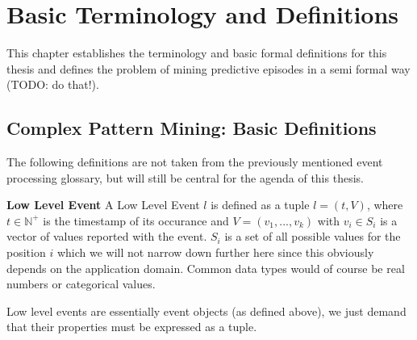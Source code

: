 \chapter{Basic Terminology and Definitions}
\label{chapter_definitions}

\ifpdf
    \graphicspath{{Chapter3/Figs/Raster/}{Chapter3/Figs/PDF/}{Chapter3/Figs/}}
\else
    \graphicspath{{Chapter3/Figs/Vector/}{Chapter3/Figs/}}
\fi

This chapter establishes the terminology and basic formal definitions for this thesis and defines the problem of mining predictive episodes in a semi formal way (TODO: do that!).

\section{Complex Pattern Mining: Basic Definitions}

The following definitions are not taken from the previously mentioned event processing glossary, but will still be central for the agenda of this thesis.

\begin{mydef}
\textbf{Low Level Event} A Low Level Event $l$ is defined as a tuple $l= (t,V)$, where $t \in \mathbb{N}^+$ is the timestamp of its occurance and $V=(v_1,...,v_k)$ with $v_i \in S_i$ is a vector of values reported with the event. $S_i$ is a set of all possible values for the position $i$ which we will not narrow down further here since this obviously depends on the application domain. Common data types would of course be real numbers or categorical values.
\end{mydef}

Low level events are essentially event objects (as defined above), we just demand that their properties must be expressed as a tuple.

